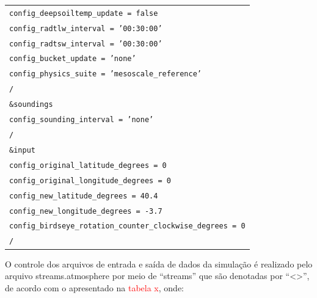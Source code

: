 \documentclass[12pt,a4paper,oneside]{book}
\providecommand{\arraybackslash}{\tabularnewline}
\begin{document}
\begin{longtable}[]{@{}
  >{\raggedright\arraybackslash}p{}@{}}
\texttt{\hspace*{1em}config\_deepsoiltemp\_update = false} \\
\texttt{\hspace*{1em}config\_radtlw\_interval = '00:30:00'} \\
\texttt{\hspace*{1em}config\_radtsw\_interval = '00:30:00'} \\
\texttt{\hspace*{1em}config\_bucket\_update = 'none'} \\
\texttt{\hspace*{1em}config\_physics\_suite = 'mesoscale\_reference'} \\
\texttt{/} \\
\texttt{\&soundings} \\
\texttt{\hspace*{1em}config\_sounding\_interval = 'none'} \\
\texttt{/} \\
\texttt{\&input} \\
\texttt{\hspace*{1em}config\_original\_latitude\_degrees = 0} \\
\texttt{\hspace*{1em}config\_original\_longitude\_degrees = 0} \\
\texttt{\hspace*{1em}config\_new\_latitude\_degrees = 40.4} \\
\texttt{\hspace*{1em}config\_new\_longitude\_degrees = -3.7} \\
\texttt{\hspace*{1em}config\_birdseye\_rotation\_counter\_clockwise\_degrees = 0} \\
\texttt{/} \\
\end{longtable}

O controle dos arquivos de entrada e saída de dados da simulação é realizado pelo arquivo streams.atmosphere por meio de ``streams'' que são denotadas por ``\textless\textgreater'', de acordo com o apresentado na \textcolor{red}{tabela x}, onde:
\end{document}
